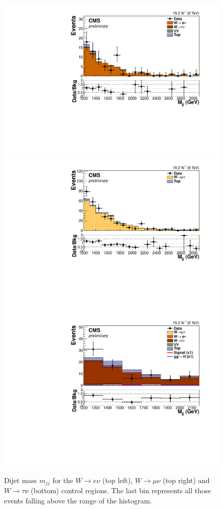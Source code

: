 \begin{figure}[h!]
  \begin{center}
    \includegraphics[width=.49\textwidth]{Chapter07/Images/output_sigreg/enu_dijet_M.pdf}
    \includegraphics[width=.49\textwidth]{Chapter07/Images/output_sigreg/munu_dijet_M.pdf} \\
    \includegraphics[width=.49\textwidth]{Chapter07/Images/output_sigreg/taunu_dijet_M.pdf}
    \caption{Dijet mass $m_{jj}$ for the $W\rightarrow e\nu$ (top left), $W\rightarrow\mu\nu$ (top right) and $W\rightarrow\tau\nu$ (bottom) control regions. The last bin represents all those events falling above the range of the histogram.}
   \label{fig:wmjjcontplots}
  \end{center}
\end{figure}
% 
